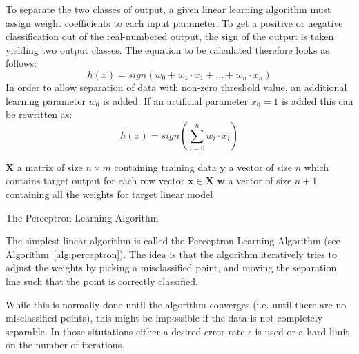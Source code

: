 To separate the two classes of output, a given linear learning algorithm must assign weight coefficients to each input parameter.
To get a positive or negative classification out of the real-numbered output, the sign of the output is taken yielding two output classes.
The equation to be calculated therefore looks as follows:
$$ h(x) = sign\left(w_0 + w_1 \cdot x_1 + \dots + w_n \cdot x_n \right) $$
In order to allow separation of data with non-zero threshold value, an additional learning parameter $w_0$ is added.
If an artificial parameter $x_0=1$ is added this can be rewritten as:
$$ h(x) = sign\left(\sum_{i=0}^n{w_i \cdot x_i}\right) $$

\begin{algorithm}
  \begin{algorithmic}[1]
    \Require $\mathbf{X}$ a matrix of size $n\times m$ containing training data
    \Require $\mathbf{y}$ a vector of size $n$ which contains target output for each row vector $\mathbf{x} \in \mathbf{X}$
    \Ensure $\mathbf{w}$ a vector of size $n+1$ containing all the weights for target linear model
    \Repeat
    \EndFor
    \EndFunction
  \end{algorithmic}
  \caption{The Perceptron Learning Algorithm}\label{alg:perceptron}
\end{algorithm}

The simplest linear algorithm is called the Perceptron Learning Algorithm (see Algorithm~\ref{alg:perceptron}). 
The idea is that the algorithm iteratively tries to adjust the weights by picking a misclassified point, and moving the separation line
such that the point is correctly classified. 

While this is normally done until the algorithm converges (i.e. until there are no misclassified points),
this might be impossible if the data is not completely separable.
In those situtations either a desired error rate $\epsilon$ is used or a hard limit on the number of iterations.

